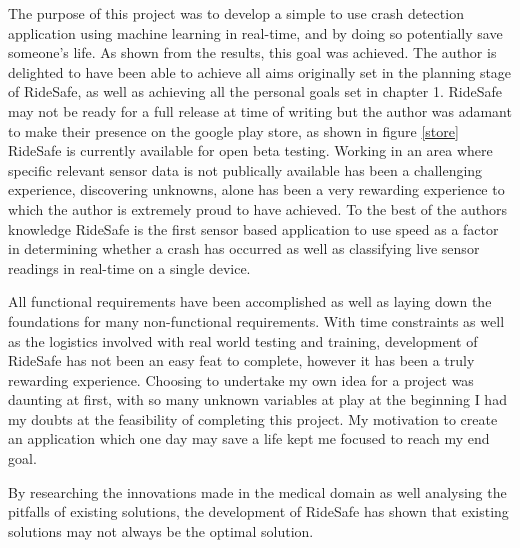  The purpose of this project was to develop a simple to use crash detection application using machine learning in real-time, and by doing so potentially save someone's life. As shown from the results, this goal was achieved. The author is delighted to have been able to achieve all aims originally set in the planning stage of RideSafe, as well as achieving all the personal goals set in chapter 1. RideSafe may not be ready for a full release at time of writing but the author was adamant to make their presence on the google play store, as shown in figure \ref{store} RideSafe is currently available for open beta testing. Working in an area where specific relevant sensor data is not publically available has been a challenging experience, discovering unknowns, alone has been a very rewarding experience to which the author is extremely proud to have achieved. To the best of the authors knowledge RideSafe is the first sensor based application to use speed as a factor in determining whether a crash has occurred as well as classifying live sensor readings in real-time on a single device.

All functional requirements have been accomplished as well as laying down the foundations for many non-functional requirements. With time constraints as well as the logistics involved with real world testing and training, development of RideSafe has not been an easy feat to complete, however it has been a truly rewarding experience. Choosing to undertake my own idea for a project was daunting at first, with so many unknown variables at play at the beginning I had my doubts at the feasibility of completing this project. My motivation to create an application which one day may save a life kept me focused to reach my end goal. 

 By researching the innovations made in the medical domain as well analysing the pitfalls of existing solutions, the development of RideSafe has shown that existing solutions may not always be the optimal solution. 


